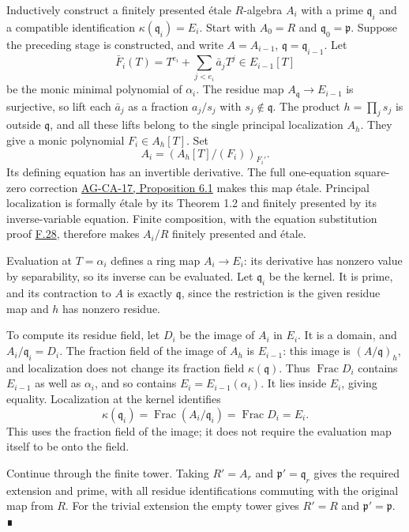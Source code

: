 \documentclass[11pt,a4paper,openany]{report}
\begin{document}
Inductively construct a finitely presented étale \(R\)-algebra \(A_i\) with a prime \(\mathfrak q_i\) and a compatible identification \(\kappa(\mathfrak q_i)=E_i\). Start with \(A_0=R\) and \(\mathfrak q_0=\mathfrak p\). Suppose the preceding stage is constructed, and write \(A=A_{i-1}\), \(\mathfrak q=\mathfrak q_{i-1}\). Let \[\bar F_i(T)=T^{e_i}+\sum_{j<e_i}\bar a_jT^j\in E_{i-1}[T]\] be the monic minimal polynomial of \(\alpha_i\). The residue map \(A_{\mathfrak q}\to E_{i-1}\) is surjective, so lift each \(\bar a_j\) as a fraction \(a_j/s_j\) with \(s_j\notin\mathfrak q\). The product \(h=\prod_j s_j\) is outside \(\mathfrak q\), and all these lifts belong to the single principal localization \(A_h\). They give a monic polynomial \(F_i\in A_h[T]\). Set \[A_i=(A_h[T]/(F_i))_{F_i'}.\] Its defining equation has an invertible derivative. The full one-equation square-zero correction \href{https://github.com/KokunoYumeto/open-math-courses/blob/d02d0a3669f42579db037cd44de1d113fdd770a1/docs/courses/AG-CA/src/formally-smooth-unramified-and-etale-ring-maps.md}{AG-CA-17, Proposition 6.1} makes this map étale. Principal localization is formally étale by its Theorem 1.2 and finitely presented by its inverse-variable equation. Finite composition, with the equation substitution proof \hyperref[AG-RG-S05-algebra-lemma-compose-finite-type]{F.28}, therefore makes \(A_i/R\) finitely presented and étale.

Evaluation at \(T=\alpha_i\) defines a ring map \(A_i\to E_i\): its derivative has nonzero value by separability, so its inverse can be evaluated. Let \(\mathfrak q_i\) be the kernel. It is prime, and its contraction to \(A\) is exactly \(\mathfrak q\), since the restriction is the given residue map and \(h\) has nonzero residue.

To compute its residue field, let \(D_i\) be the image of \(A_i\) in \(E_i\). It is a domain, and \(A_i/\mathfrak q_i=D_i\). The fraction field of the image of \(A_h\) is \(E_{i-1}\): this image is \((A/\mathfrak q)_h\), and localization does not change its fraction field \(\kappa(\mathfrak q)\). Thus \(\operatorname{Frac}D_i\) contains \(E_{i-1}\) as well as \(\alpha_i\), and so contains \(E_i=E_{i-1}(\alpha_i)\). It lies inside \(E_i\), giving equality. Localization at the kernel identifies \[\kappa(\mathfrak q_i)=\operatorname{Frac}(A_i/\mathfrak q_i)
=\operatorname{Frac}D_i=E_i.\] This uses the fraction field of the image; it does not require the evaluation map itself to be onto the field.

Continue through the finite tower. Taking \(R'=A_r\) and \(\mathfrak p'=\mathfrak q_r\) gives the required extension and prime, with all residue identifications commuting with the original map from \(R\). For the trivial extension the empty tower gives \(R'=R\) and \(\mathfrak p'=\mathfrak p\). ∎
\end{document}
